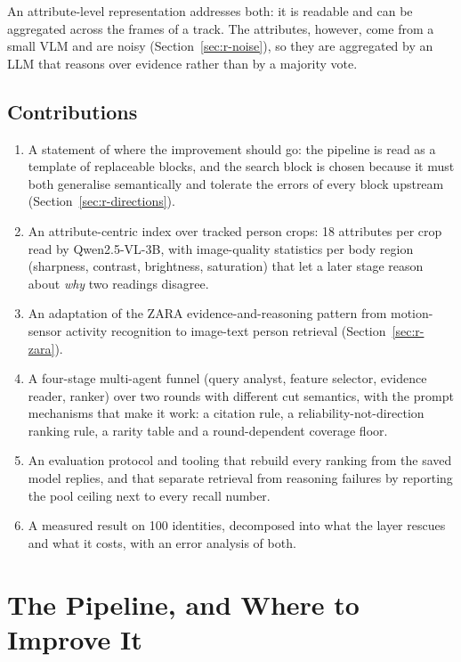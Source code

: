 An attribute-level representation addresses both: it is readable and can be
aggregated across the frames of a track. The attributes, however, come from a small
VLM and are noisy (Section~\ref{sec:r-noise}), so they are aggregated by an LLM
that reasons over evidence rather than by a majority vote.

\subsection{Contributions}
\begin{enumerate}
\item A statement of where the improvement should go: the pipeline is read as a
      template of replaceable blocks, and the search block is chosen because it
      must both generalise semantically and tolerate the errors of every block
      upstream (Section~\ref{sec:r-directions}).
\item An attribute-centric index over tracked person crops: 18 attributes per crop
      read by Qwen2.5-VL-3B, with image-quality statistics per body region
      (sharpness, contrast, brightness, saturation) that let a later stage reason
      about \emph{why} two readings disagree.
\item An adaptation of the ZARA evidence-and-reasoning pattern from motion-sensor
      activity recognition to image-text person retrieval
      (Section~\ref{sec:r-zara}).
\item A four-stage multi-agent funnel (query analyst, feature selector, evidence
      reader, ranker) over two rounds with different cut semantics, with the prompt
      mechanisms that make it work: a citation rule, a reliability-not-direction
      ranking rule, a rarity table and a round-dependent coverage floor.
\item An evaluation protocol and tooling that rebuild every ranking from the saved
      model replies, and that separate retrieval from reasoning failures by
      reporting the pool ceiling next to every recall number.
\item A measured result on 100 identities, decomposed into what the layer rescues
      and what it costs, with an error analysis of both.
\end{enumerate}

\section{The Pipeline, and Where to Improve It}


